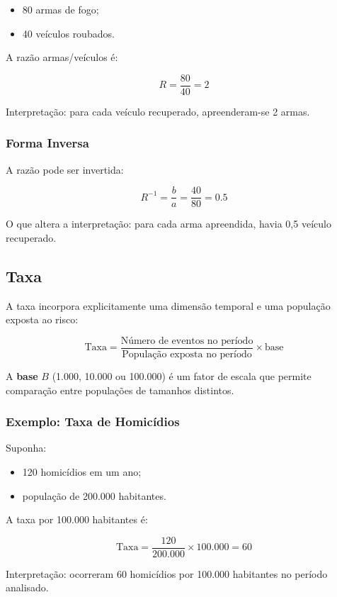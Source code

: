 \begin{itemize}
\item 80 armas de fogo;
\item 40 veículos roubados.
\end{itemize}

A razão armas/veículos é:

\[
R = \frac{80}{40} = 2
\]

Interpretação: para cada veículo recuperado, apreenderam-se 2 armas.

\subsubsection*{Forma Inversa}

A razão pode ser invertida:

\[
R^{-1} = \frac{b}{a} = \frac{40}{80} = 0.5
\]

O que altera a interpretação: para cada arma apreendida, havia 0,5 veículo recuperado.

\subsection{Taxa}

A taxa incorpora explicitamente uma dimensão temporal e uma população exposta ao risco:

\[
\text{Taxa} = \frac{\text{Número de eventos no período}}{\text{População exposta no período}} \times \text{base}
\]

\vskip0.3cm
A \textbf{base} $B$ (1.000, 10.000 ou 100.000) é um fator de escala que permite comparação entre populações de tamanhos distintos.

\subsubsection*{Exemplo: Taxa de Homicídios}

Suponha:

\begin{itemize}
\item 120 homicídios em um ano;
\item população de 200.000 habitantes.
\end{itemize}

A taxa por 100.000 habitantes é:

\[
\text{Taxa} = \frac{120}{200.000} \times 100.000 = 60
\]

Interpretação: ocorreram 60 homicídios por 100.000 habitantes no período analisado.

